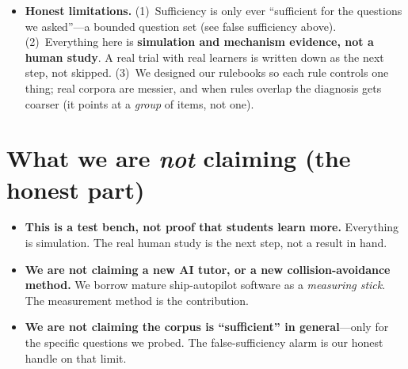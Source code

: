 \documentclass[11pt]{article}
\begin{document}
\begin{itemize}[leftmargin=1.4em]
  when we \emph{gently} erase ``turn to starboard,'' the model stops \emph{saying} the rule (it
  quits citing ``Rule 14,'' and every text-based ``did it forget?'' score reports success---probe
  dropped from 0.43 to 0.27), yet on the actual steering test the ship \textbf{still turns to
  starboard, unchanged} ($\Delta = 0.000$). The model changed what it \emph{says}, not what it
  \emph{does}---and our instrument measures the \emph{decision}, so it wasn't fooled. A supporting
  sidelight, not the keystone.
  \item \textbf{Honest limitations.} (1)~Sufficiency is only ever ``sufficient for the questions we
  asked''---a bounded question set (see false sufficiency above). (2)~Everything here is
  \textbf{simulation and mechanism evidence, not a human study}. A real trial with real learners is
  written down as the next step, not skipped. (3)~We designed our rulebooks so each rule controls
  one thing; real corpora are messier, and when rules overlap the diagnosis gets coarser (it points
  at a \emph{group} of items, not one).
\end{itemize}

\section*{What we are \emph{not} claiming (the honest part)}

\begin{itemize}[leftmargin=1.4em]
  \item \textbf{This is a test bench, not proof that students learn more.} Everything is
  simulation. The real human study is the next step, not a result in hand.
  \item \textbf{We are not claiming a new AI tutor, or a new collision-avoidance method.} We
  borrow mature ship-autopilot software as a \emph{measuring stick}. The measurement method is the
  contribution.
  \item \textbf{We are not claiming the corpus is ``sufficient'' in general}---only for the
  specific questions we probed. The false-sufficiency alarm is our honest handle on that limit.
\end{itemize}
\end{document}
